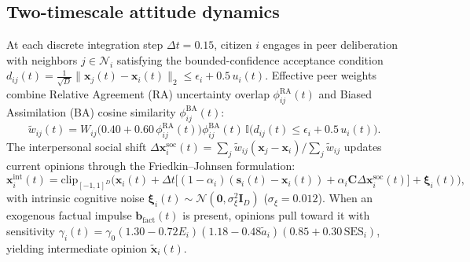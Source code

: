 \documentclass[11pt,a4paper]{article}
\begin{document}
\subsection*{Two-timescale attitude dynamics}
At each discrete integration step $\Delta t = 0.15$, citizen $i$ engages in peer deliberation with neighbors $j \in \mathcal{N}_i$ satisfying the bounded-confidence acceptance condition $d_{ij}(t) = \frac{1}{\sqrt{D}}\|\mathbf{x}_j(t) - \mathbf{x}_i(t)\|_2 \le \epsilon_i + 0.5\,u_i(t)$. Effective peer weights combine Relative Agreement (RA) uncertainty overlap $\phi_{ij}^{\mathrm{RA}}(t)$ and Biased Assimilation (BA) cosine similarity $\phi_{ij}^{\mathrm{BA}}(t)$:
\begin{equation}
    \tilde{w}_{ij}(t) = W_{ij} \big(0.40 + 0.60\,\phi_{ij}^{\mathrm{RA}}(t)\big) \phi_{ij}^{\mathrm{BA}}(t) \, \mathbb{I}\!\big(d_{ij}(t) \le \epsilon_i + 0.5\,u_i(t)\big).
    \label{eq:methods_peer_weight}
\end{equation}
The interpersonal social shift $\Delta \mathbf{x}_i^{\mathrm{soc}}(t) = \sum_{j} \tilde{w}_{ij}(\mathbf{x}_j - \mathbf{x}_i) / \sum_j \tilde{w}_{ij}$ updates current opinions through the Friedkin--Johnsen formulation:
\begin{equation}
    \mathbf{x}_i^{\mathrm{int}}(t) = \mathrm{clip}_{[-1, 1]^D}\!\Big(\mathbf{x}_i(t) + \Delta t \big[(1 - \alpha_i)(\mathbf{s}_i(t) - \mathbf{x}_i(t)) + \alpha_i \mathbf{C}\Delta \mathbf{x}_i^{\mathrm{soc}}(t)\big] + \boldsymbol{\xi}_i(t)\Big),
    \label{eq:methods_fj}
\end{equation}
with intrinsic cognitive noise $\boldsymbol{\xi}_i(t) \sim \mathcal{N}(\mathbf{0}, \sigma_{\xi}^2 \mathbf{I}_D)$ ($\sigma_{\xi} = 0.012$). When an exogenous factual impulse $\mathbf{b}_{\mathrm{fact}}(t)$ is present, opinions pull toward it with sensitivity $\gamma_i(t) = \gamma_0 (1.30 - 0.72 E_i)(1.18 - 0.48\tilde{a}_i)(0.85 + 0.30\,\mathrm{SES}_i)$, yielding intermediate opinion $\tilde{\mathbf{x}}_i(t)$.
\end{document}
